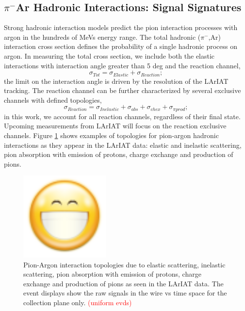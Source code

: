 \documentclass[aps,prl,twocolumn,showpacs,superscriptaddress,groupedaddress]{revtex4}  %
\begin{document}
\subsection{\label{sec:Sign} $\pi^{-}$Ar Hadronic Interactions: Signal Signatures}
Strong hadronic interaction models \cite{9780198520085,9780471779957} predict the pion interaction processes with argon in the hundreds of MeVs energy range. 
The total hadronic ($\pi^{-}$,Ar) interaction cross section defines the probability of a single hadronic process on argon.  In measuring the total cross section, we include both the elastic interactions with interaction angle greater than 5 deg and  the reaction channel, 
\begin{equation}
\sigma_{Tot} = \sigma_{Elastic}+ \sigma_{Reaction}; 
\end{equation}
the limit on the interaction angle is driven by the resolution of the LArIAT tracking.
The reaction channel can be further characterized by several exclusive channels with defined topologies,
\begin{equation}
\sigma_{Reaction} = \sigma_{Inelastic} + \sigma_{abs} + \sigma_{chex}+ \sigma_{\pi prod};
\end{equation}
in this work, we account for all reaction channels, regardless of their final state. Upcoming measurements from LArIAT will focus on the reaction exclusive channels.
Figure \ref{fig:PionsEvd} shows examples of topologies for pion-argon hadronic interactions as they appear in the  LArIAT data: elastic and inelastic scattering, pion absorption with emission of protons, charge exchange and production of pions.


\begin{figure}
  \centering  
\includegraphics[width =0.4\textwidth]{face-smile-big.png}
\caption{Pion-Argon interaction topologies due to elastic scattering, inelastic scattering, pion absorption with emission of protons, charge exchange and production of pions as seen in the LArIAT data. The event displays show the raw signals in the wire vs time space for the collection plane only. \textcolor{red}{(uniform evds)}}
\label{fig:PionsEvd}
\end{figure}
\end{document}

